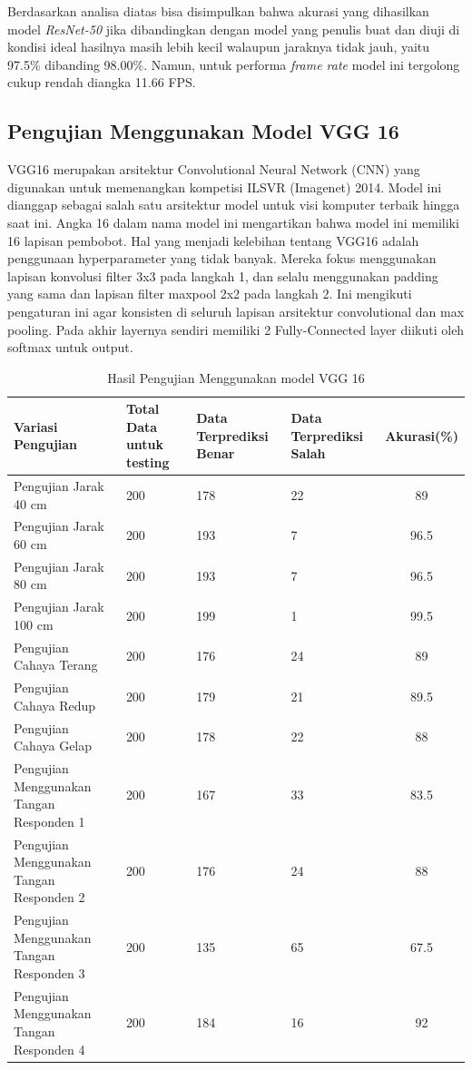 Berdasarkan analisa diatas bisa disimpulkan bahwa akurasi yang dihasilkan model \emph{ResNet-50} jika dibandingkan dengan model yang penulis buat dan diuji di kondisi ideal hasilnya masih lebih kecil walaupun jaraknya tidak jauh, yaitu 97.5\% dibanding 98.00\%. Namun, untuk performa \emph{frame rate} model ini tergolong cukup rendah diangka 11.66 FPS. 

\subsection{Pengujian Menggunakan Model VGG 16}
\label{subsec:Pengujian Menggunakan Model VGG 16}

VGG16 merupakan arsitektur Convolutional Neural Network (CNN) yang digunakan untuk memenangkan kompetisi ILSVR (Imagenet) 2014. Model ini dianggap sebagai salah satu arsitektur model untuk visi komputer terbaik hingga saat ini. Angka 16 dalam nama model ini mengartikan bahwa model ini memiliki 16 lapisan pembobot. Hal yang menjadi kelebihan tentang VGG16 adalah penggunaan hyperparameter yang tidak banyak. Mereka fokus menggunakan lapisan konvolusi filter 3x3 pada langkah 1, dan selalu menggunakan padding yang sama dan lapisan filter maxpool 2x2 pada langkah 2. Ini mengikuti pengaturan ini agar konsisten di seluruh lapisan arsitektur convolutional dan max pooling. Pada akhir layernya sendiri memiliki 2 Fully-Connected layer diikuti oleh softmax untuk output.

\begin{longtable}[!htb]{|M{25mm}|M{30mm}|M{30mm}|M{30mm}|c|}
  \caption{Hasil Pengujian Menggunakan model VGG 16}
  \label{tb:Hasil Pengujian Menggunakan model VGG 16}\\
  \hline
  \textbf{Variasi Pengujian} & \textbf{Total Data untuk testing} & \textbf{Data Terprediksi Benar} & \textbf{Data Terprediksi Salah} & \textbf{Akurasi(\%)} \\ 
  \hline
  \endhead
  Pengujian Jarak 40 cm & 200 & 178 & 22 & 89 \\ \hline
  Pengujian Jarak 60 cm & 200 & 193 & 7 & 96.5 \\ \hline
  Pengujian Jarak 80 cm & 200 & 193 & 7 & 96.5 \\ \hline
  Pengujian Jarak 100 cm & 200 & 199 & 1 & 99.5 \\ \hline
  Pengujian Cahaya Terang & 200 & 176 & 24 & 89 \\ \hline
  Pengujian Cahaya Redup & 200 & 179 & 21 & 89.5 \\ \hline
  Pengujian Cahaya Gelap & 200 & 178 & 22 & 88 \\ \hline
  Pengujian Menggunakan Tangan Responden 1 & 200 & 167 & 33 & 83.5 \\ \hline
  Pengujian Menggunakan Tangan Responden 2 & 200 & 176 & 24 & 88 \\ \hline
  Pengujian Menggunakan Tangan Responden 3 & 200 & 135 & 65 & 67.5 \\ \hline
  Pengujian Menggunakan Tangan Responden 4 & 200 & 184 & 16 & 92 \\ \hline
\end{longtable}

